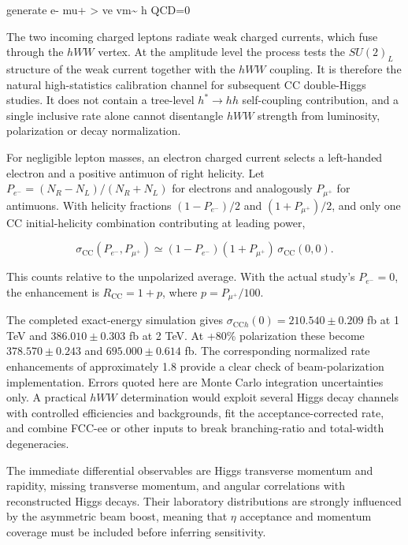 \documentclass[12pt,a4paper]{article}
\newcommand{\CC}{\mathrm{CC}}
\begin{document}
\begin{center}\ttfamily\small generate e- mu+ > ve vm\textasciitilde{} h QCD=0\end{center}

The two incoming charged leptons radiate weak charged currents, which fuse through the $hWW$ vertex. At the amplitude level the process tests the $SU(2)_L$ structure of the weak current together with the $hWW$ coupling. It is therefore the natural high-statistics calibration channel for subsequent CC double-Higgs studies. It does not contain a tree-level $h^*\to hh$ self-coupling contribution, and a single inclusive rate alone cannot disentangle $hWW$ strength from luminosity, polarization or decay normalization.

For negligible lepton masses, an electron charged current selects a left-handed electron and a positive antimuon of right helicity. Let $P_{e^-}=(N_R-N_L)/(N_R+N_L)$ for electrons and analogously $P_{\mu^+}$ for antimuons. With helicity fractions $(1-P_{e^-})/2$ and $(1+P_{\mu^+})/2$, and only one CC initial-helicity combination contributing at leading power,

\begin{equation}
\label{eq:ccpol}
\sigma_{\CC}(P_{e^-},P_{\mu^+})\simeq
(1-P_{e^-})(1+P_{\mu^+})\,\sigma_{\CC}(0,0).
\end{equation}

This counts relative to the unpolarized average. With the actual study's $P_{e^-}=0$, the enhancement is $R_{\CC}=1+p$, where $p=P_{\mu^+}/100$.

The completed exact-energy simulation gives $\sigma_{\CC h}(0)=210.540\pm0.209$ fb at 1 TeV and $386.010\pm0.303$ fb at 2 TeV. At +80\% polarization these become $378.570\pm0.243$ and $695.000\pm0.614$ fb. The corresponding normalized rate enhancements of approximately 1.8 provide a clear check of beam-polarization implementation. Errors quoted here are Monte Carlo integration uncertainties only. A practical $hWW$ determination would exploit several Higgs decay channels with controlled efficiencies and backgrounds, fit the acceptance-corrected rate, and combine FCC-ee or other inputs to break branching-ratio and total-width degeneracies.

The immediate differential observables are Higgs transverse momentum and rapidity, missing transverse momentum, and angular correlations with reconstructed Higgs decays. Their laboratory distributions are strongly influenced by the asymmetric beam boost, meaning that $\eta$ acceptance and momentum coverage must be included before inferring sensitivity.
\end{document}
